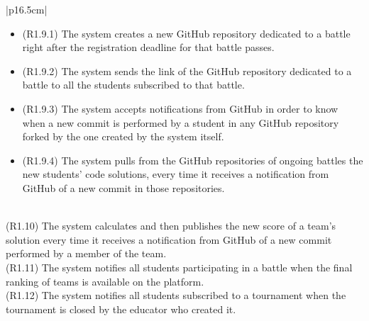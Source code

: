 \begin{longtable}{|p{16.5cm}|}
\begin{minipage}[t]{\linewidth}
\begin{itemize}[nosep]
\item (R1.9.1) The system creates a new GitHub repository dedicated to a battle right after the registration deadline for that battle passes.
\item (R1.9.2) The system sends the link of the GitHub repository dedicated to a battle to all the students subscribed to that battle.
\item (R1.9.3) The system accepts notifications from GitHub in order to know when a new commit is performed by a student in any GitHub repository forked by the one created by the system itself.
\item (R1.9.4) The system pulls from the GitHub repositories of ongoing battles the new students' code solutions, every time it receives a notification from GitHub of a new commit in those repositories.\\
\end{itemize}
\end{minipage} 
\\
\hline 
(R1.10) The system calculates and then publishes the new score of a team's solution every time it receives a notification from GitHub of a new commit performed by a member of the team. \\
\hline
(R1.11) The system notifies all students participating in a battle when the final ranking of teams is available on the platform.  \\
\hline
(R1.12) The system notifies all students subscribed to a tournament when the tournament is closed by the educator who created it.\\
\hline
\end{longtable}

\vspace*{1cm}

